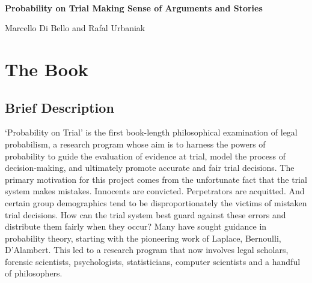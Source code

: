 \documentclass[
  10pt,
  dvipsnames,enabledeprecatedfontcommands]{scrartcl}
\author{}
\date{\vspace{-2.5em}}
\begin{document}
\begin{center}

$\, $

\vspace{-10mm}

\textbf{\huge  Probability on Trial \linebreak \normalsize  Making Sense of Arguments and Stories}
\vspace{1mm}

Marcello Di Bello and Rafal Urbaniak
\end{center}

\vspace{-6mm}

\hypertarget{the-book}{%
\section{The Book}\label{the-book}}

\vspace{-2mm}

\hypertarget{brief-description}{%
\subsection{Brief Description}\label{brief-description}}

\normalsize

`Probability on Trial' is the first book-length philosophical
examination of legal probabilism, a research program whose aim is to
harness the powers of probability to guide the evaluation of evidence at
trial, model the process of decision-making, and ultimately promote
accurate and fair trial decisions. The primary motivation for this
project comes from the unfortunate fact that the trial system makes
mistakes. Innocents are convicted. Perpetrators are acquitted. And
certain group demographics tend to be disproportionately the victims of
mistaken trial decisions. How can the trial system best guard against
these errors and distribute them fairly when they occur? Many have
sought guidance in probability theory, starting with the pioneering work
of Laplace, Bernoulli, D'Alambert. This led to a research program that
now involves legal scholars, forensic scientists, psychologists,
statisticians, computer scientists and a handful of philosophers.
\end{document}
